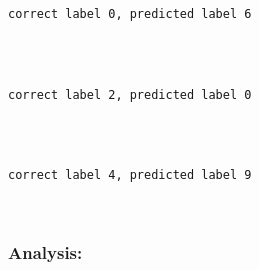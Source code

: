 \documentclass[11pt]{article}
\begin{document}
    \begin{Verbatim}[commandchars=\\\{\}]

correct label 0, predicted label 6

    \end{Verbatim}

    \begin{center}
    \end{center}
    { \hspace*{\fill} \\}
    
    \begin{Verbatim}[commandchars=\\\{\}]

correct label 2, predicted label 0

    \end{Verbatim}

    \begin{center}
    \end{center}
    { \hspace*{\fill} \\}
    
    \begin{Verbatim}[commandchars=\\\{\}]

correct label 4, predicted label 9

    \end{Verbatim}

    \begin{center}
    \end{center}
    { \hspace*{\fill} \\}
    
    \subsubsection{Analysis:}\label{analysis}
\end{document}
